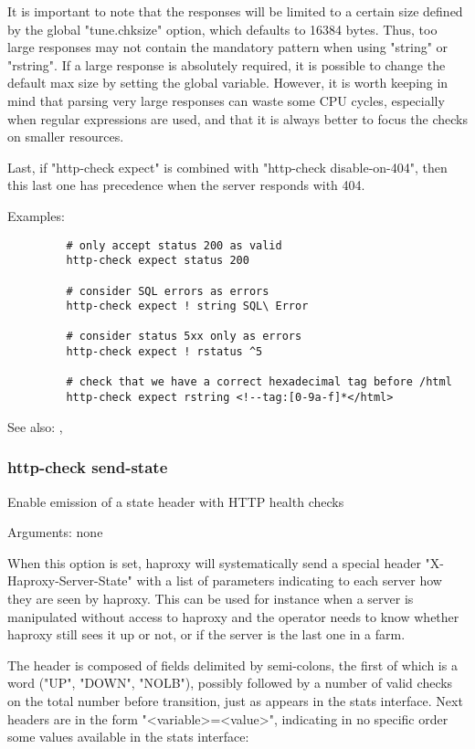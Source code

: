   It is important to note that the responses will be limited to a certain size
  defined by the global "tune.chksize" option, which defaults to 16384 bytes.
  Thus, too large responses may not contain the mandatory pattern when using
  "string" or "rstring". If a large response is absolutely required, it is
  possible to change the default max size by setting the global variable.
  However, it is worth keeping in mind that parsing very large responses can
  waste some CPU cycles, especially when regular expressions are used, and that
  it is always better to focus the checks on smaller resources.

  Last, if "http-check expect" is combined with "http-check disable-on-404",
  then this last one has precedence when the server responds with 404.

  Examples:
  \begin{verbatim}
         # only accept status 200 as valid
         http-check expect status 200

         # consider SQL errors as errors
         http-check expect ! string SQL\ Error

         # consider status 5xx only as errors
         http-check expect ! rstatus ^5

         # check that we have a correct hexadecimal tag before /html
         http-check expect rstring <!--tag:[0-9a-f]*</html>
  \end{verbatim}

  See also: , 

\subsubsection[http-check send-state]{http-check send-state}
  Enable emission of a state header with HTTP health checks
  
  
  Arguments: none

  When this option is set, haproxy will systematically send a special header
  "X-Haproxy-Server-State" with a list of parameters indicating to each server
  how they are seen by haproxy. This can be used for instance when a server is
  manipulated without access to haproxy and the operator needs to know whether
  haproxy still sees it up or not, or if the server is the last one in a farm.

  The header is composed of fields delimited by semi-colons, the first of which
  is a word ("UP", "DOWN", "NOLB"), possibly followed by a number of valid
  checks on the total number before transition, just as appears in the stats
  interface. Next headers are in the form "<variable>=<value>", indicating in
  no specific order some values available in the stats interface:
  
